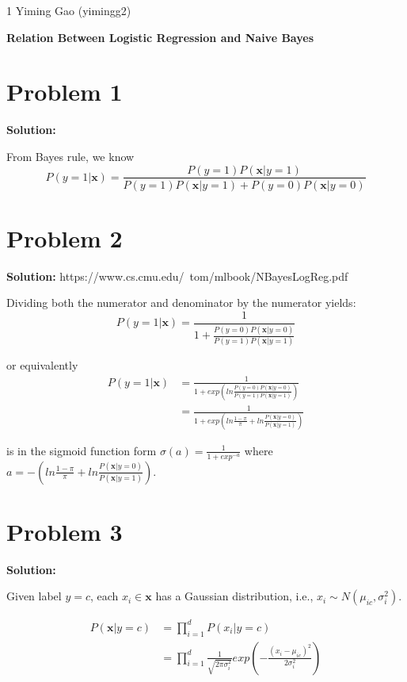\documentclass[11pt]{article}
\begin{document}
\homework
    {1}
    {Yiming Gao (yimingg2)}
    {}

\begin{center}
      \Large\textbf{Relation Between Logistic Regression and Naive Bayes}\\
\end{center}

\section*{Problem 1}
\textbf{Solution:} 

From Bayes rule, we know
$$P(y = 1|\bm{x}) = \frac{P(y = 1)P(\bm{x}|y=1)}{P(y = 1)P(\bm{x}|y = 1) + P(y = 0)P(\bm{x}|y = 0)}$$

\section*{Problem 2}
\textbf{Solution:} 
https://www.cs.cmu.edu/~tom/mlbook/NBayesLogReg.pdf

Dividing both the numerator and denominator by the numerator yields:
$$P(y = 1|\bm{x}) = \frac{1}{1 + \frac{P(y=0)P(\bm{x}|y=0)}{P(y=1)P(\bm{x}|y=1)}}$$

or equivalently
\begin{align*}
P(y = 1|\bm{x}) &= 
\frac{1}{1 + exp(ln\frac{P(y=0)P(\bm{x}|y=0)}{P(y=1)P(\bm{x}|y=1)})} \\
& = \frac{1}{1 + exp(ln\frac{1-\pi}{\pi} + ln\frac{P(\bm{x}|y = 0)}{P(\bm{x}|y = 1)})}
\end{align*}

is in the sigmoid function form $\sigma(a) = \frac{1}{1+exp^{-a}}$ where $a = -(ln\frac{1-\pi}{\pi} + ln\frac{P(\bm{x}|y = 0)}{P(\bm{x}|y = 1)})$.

\section*{Problem 3}
\textbf{Solution:} 

Given label $y = c$, each $x_i \in \bm{x}$ has a Gaussian distribution, i.e., $x_i \sim N(\mu_{ic}, \sigma_i^2)$.

\begin{align*}
P(\bm{x}|y = c) &= \prod_{i = 1}^d P(x_i|y = c) \\
&= \prod_{i = 1}^d \frac{1}{\sqrt{2\pi \sigma_i^2}}exp(-\frac{(x_i - \mu_{ic})^2}{2\sigma_i^2})
\end{align*}
\end{document}

